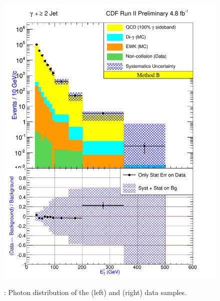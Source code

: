 \documentclass[11pt]{article}
\begin{document}
\begin{figure}[h!]
{ \includegraphics[scale=\resultsHistScale,keepaspectratio=true]{./g30jet_MtdB_plot2_Et_pho.pdf}
}

 \caption{: Photon \et distribution of the \phoonejet (left) and \photwojet (right) data samples.}
 \label{fig:Result_MtdB_gj1_PhoEt}
\end{figure}
\end{document}
